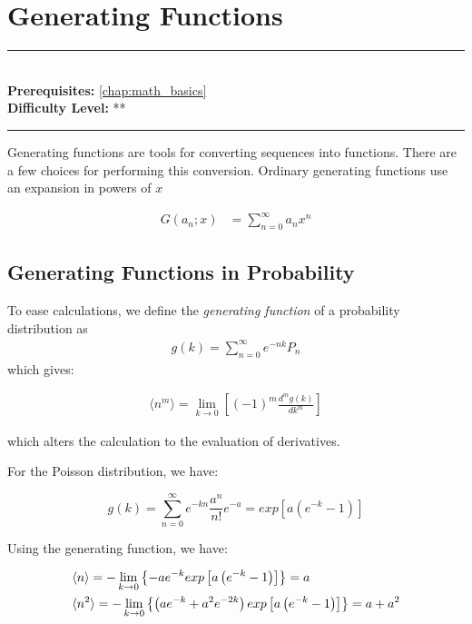 \documentclass[book.tex]{subfiles}
\begin{document}
\chapter{Generating Functions}
\label{chap:generating_functions}
\noindent\rule{11cm}{0.4pt} \\
\textbf{Prerequisites:} \autoref{chap:math_basics} \\
\textbf{Difficulty Level:} ** \\
\noindent\rule{11cm}{0.4pt}
\vspace{5mm}

Generating functions are tools for converting sequences into functions. There are a few choices for performing this conversion. Ordinary generating functions use an expansion in powers of $x$

\begin{align}
    G(a_n; x) &= \sum_{n=0}^\infty a_n x^n
\end{align}

\section{Generating Functions in Probability}

To ease calculations, we define the \textit{generating function} of a probability distribution as 
\begin{align}
    g(k) = \sum_{n=0}^{\infty}e^{-nk}P_n
\end{align}
which gives:

\begin{align}\label{Eq14}
\langle n^m \rangle = \lim_{k\rightarrow 0}\left[(-1)^m\frac{d^mg(k)}{dk^m}\right]
\end{align}

\noindent which alters the calculation to the evaluation of derivatives.

For the Poisson distribution, we have:

\begin{equation}\label{Eq15}
g(k)= \sum_{n=0}^{\infty}e^{-kn}\frac{a^n}{n!}e^{-a}=exp\left[a\left(e^{-k}-1\right)\right]
\end{equation}

Using the generating function, we have:

\begin{align}
&\langle n \rangle = -\lim_{k \rightarrow 0} \left\{-ae^{-k} exp \left[a \left(e^{-k}-1\right)\right]\right\}=a \notag\\
&\langle n^2 \rangle = -\lim_{k\rightarrow 0} \left\{ \left(a e^{-k}+a^2 e^{-2k}\right) exp\left[ a \left(e^{-k}-1\right)\right] \right\} = a + a^2 \notag
\end{align}

\end{document}

